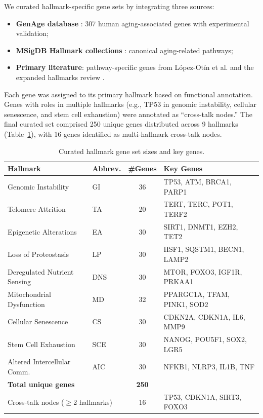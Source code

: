 \documentclass[11pt,a4paper]{article}
\begin{document}
We curated hallmark-specific gene sets by integrating three sources:
\begin{itemize}[noitemsep]
    \item \textbf{GenAge database} \citep{tacutu2018human}: 307 human aging-associated genes with experimental validation;
    \item \textbf{MSigDB Hallmark collections} \citep{liberzon2015molecular}: canonical aging-related pathways;
    \item \textbf{Primary literature}: pathway-specific genes from L\'{o}pez-Ot\'{i}n et al. \citep{lopez2013hallmarks} and the expanded hallmarks review \citep{lopez2023hallmarks}.
\end{itemize}

Each gene was assigned to its primary hallmark based on functional annotation. Genes with roles in multiple hallmarks (e.g., TP53 in genomic instability, cellular senescence, and stem cell exhaustion) were annotated as ``cross-talk nodes.'' The final curated set comprised 250 unique genes distributed across 9 hallmarks (Table~\ref{tab:gene_sets}), with 16 genes identified as multi-hallmark cross-talk nodes.

\begin{table}[H]
\centering
\caption{Curated hallmark gene set sizes and key genes.}
\label{tab:gene_sets}
\small
\begin{tabular}{llcl}
\toprule
\textbf{Hallmark} & \textbf{Abbrev.} & \textbf{\#Genes} & \textbf{Key Genes} \\
\midrule
Genomic Instability & GI & 36 & TP53, ATM, BRCA1, PARP1 \\
Telomere Attrition & TA & 20 & TERT, TERC, POT1, TERF2 \\
Epigenetic Alterations & EA & 30 & SIRT1, DNMT1, EZH2, TET2 \\
Loss of Proteostasis & LP & 30 & HSF1, SQSTM1, BECN1, LAMP2 \\
Deregulated Nutrient Sensing & DNS & 30 & MTOR, FOXO3, IGF1R, PRKAA1 \\
Mitochondrial Dysfunction & MD & 32 & PPARGC1A, TFAM, PINK1, SOD2 \\
Cellular Senescence & CS & 30 & CDKN2A, CDKN1A, IL6, MMP9 \\
Stem Cell Exhaustion & SCE & 30 & NANOG, POU5F1, SOX2, LGR5 \\
Altered Intercellular Comm. & AIC & 30 & NFKB1, NLRP3, IL1B, TNF \\
\midrule
\multicolumn{2}{l}{\textbf{Total unique genes}} & \textbf{250} & \\
\multicolumn{2}{l}{Cross-talk nodes ($\geq$2 hallmarks)} & 16 & TP53, CDKN1A, SIRT3, FOXO3 \\
\bottomrule
\end{tabular}
\end{table}
\end{document}
